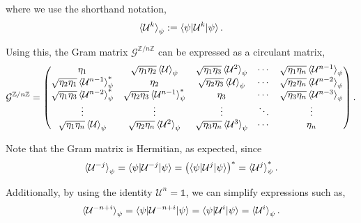 \documentclass[12pt,letterpaper]{article}
\begin{document}
where we use the shorthand notation,
\begin{align*}
	\braket{\mathcal{U}^k}_\psi := \braket{\psi | \mathcal{U}^k | \psi}.
\end{align*}

Using this, the Gram matrix $\mathcal{G}^{\mathbb{Z}/n\mathbb{Z}}$ can be expressed as a circulant matrix,
\begin{align*}
	\mathcal{G}^{\mathbb{Z}/n\mathbb{Z}} = \begin{pmatrix}
 \eta_1 & \sqrt{\eta_1 \eta_2}\braket{\mathcal{U}}_{\psi} & \sqrt{\eta_1 \eta_3}\braket{\mathcal{U}^2}_{\psi} & \cdots & \sqrt{\eta_1 \eta_n}\braket{\mathcal{U}^{n-1}}_{\psi} \\
 \sqrt{\eta_2 \eta_1}\braket{\mathcal{U}^{n-1}}_{\psi}^* & \eta_2 & \sqrt{\eta_2 \eta_3}\braket{\mathcal{U}}_{\psi} & \cdots & \sqrt{\eta_2 \eta_n}\braket{\mathcal{U}^{n-2}}_{\psi} \\
 \sqrt{\eta_1 \eta_3}\braket{\mathcal{U}^{n-2}}_{\psi}^* & \sqrt{\eta_2 \eta_3}\braket{\mathcal{U}^{n-1}}_{\psi}^* & \eta_3 & \cdots & \sqrt{\eta_3 \eta_n}\braket{\mathcal{U}^{n-3}}_{\psi} \\
 \vdots & \vdots & \vdots & \ddots & \vdots \\
 \sqrt{\eta_1 \eta_n}\braket{\mathcal{U}}_{\psi} & \sqrt{\eta_2 \eta_n}\braket{\mathcal{U}^{2}}_{\psi} & \sqrt{\eta_3 \eta_n}\braket{\mathcal{U}^{3}}_{\psi} & \cdots & \eta_n
\end{pmatrix}.
\end{align*}

Note that the Gram matrix is Hermitian, as expected, since
\begin{align*}
    \braket{\mathcal{U}^{-j}}_{\psi} = \braket{\psi | \mathcal{U}^{-j} | \psi} = \left(\braket{\psi | \mathcal{U}^j | \psi}\right)^* = \braket{\mathcal{U}^j}_{\psi}^*.
\end{align*}

Additionally, by using the identity $\mathcal{U}^n = \mathds{1}$, we can simplify expressions such as,
\begin{align*}
	\braket{\mathcal{U}^{-n+i}}_\psi = \braket{\psi | \mathcal{U}^{-n+i} | \psi} = \braket{\psi | \mathcal{U}^i | \psi} = \braket{\mathcal{U}^i}_\psi.
\end{align*}
\end{document}
